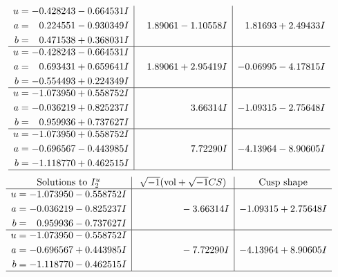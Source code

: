\documentclass[1p]{elsarticle_modified}
\theoremstyle{definition}
\newcommand{\I}{\sqrt{-1}}
\begin{document}
$$\begin{array}{c|c|c}
\begin{aligned}
u &= -0.428243 - 0.664531 I \\
a &= \phantom{-}0.224551 - 0.930349 I \\
b &= \phantom{-}0.471538 + 0.368031 I\end{aligned}
 & \phantom{-}1.89061 - 1.10558 I & \phantom{-}1.81693 + 2.49433 I \\ \hline\begin{aligned}
u &= -0.428243 - 0.664531 I \\
a &= \phantom{-}0.693431 + 0.659641 I \\
b &= -0.554493 + 0.224349 I\end{aligned}
 & \phantom{-}1.89061 + 2.95419 I & -0.06995 - 4.17815 I \\ \hline\begin{aligned}
u &= -1.073950 + 0.558752 I \\
a &= -0.036219 + 0.825237 I \\
b &= \phantom{-}0.959936 + 0.737627 I\end{aligned}
 & \phantom{-0.000000 -}3.66314 I & -1.09315 - 2.75648 I \\ \hline\begin{aligned}
u &= -1.073950 + 0.558752 I \\
a &= -0.696567 - 0.443985 I \\
b &= -1.118770 + 0.462515 I\end{aligned}
 & \phantom{-0.000000 -}7.72290 I & -4.13964 - 8.90605 I\\
 \hline 
 \end{array}$$\newpage$$\begin{array}{c|c|c}  
\text{Solutions to }I^u_{2}& \I (\text{vol} + \sqrt{-1}CS) & \text{Cusp shape}\\
 \hline 
\begin{aligned}
u &= -1.073950 - 0.558752 I \\
a &= -0.036219 - 0.825237 I \\
b &= \phantom{-}0.959936 - 0.737627 I\end{aligned}
 & \phantom{-0.000000 } -3.66314 I & -1.09315 + 2.75648 I \\ \hline\begin{aligned}
u &= -1.073950 - 0.558752 I \\
a &= -0.696567 + 0.443985 I \\
b &= -1.118770 - 0.462515 I\end{aligned}
 & \phantom{-0.000000 } -7.72290 I & -4.13964 + 8.90605 I\\
 \hline 
 \end{array}$$\newpage
\end{document}
